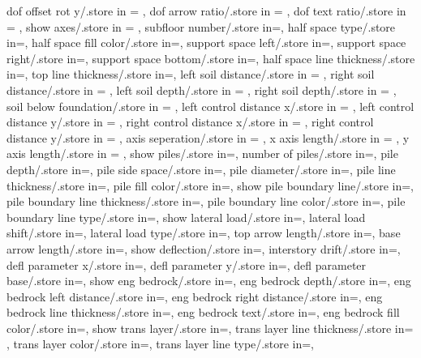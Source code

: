 {  dof offset rot y/.store in = \dofrotoffsety,
  dof arrow ratio/.store in = \dofarrowratio,
  dof text ratio/.store in = \doftextratio,
  show axes/.store in = \showaxes,
  subfloor number/.store in=\subfloors,
  half space type/.store in=\halfspacetype,
  half space fill color/.store in=\halfspacefillcolor,
  support space left/.store in=\hsdistleft,
  support space right/.store in=\hsdistright,
  support space bottom/.store in=\hsdistbottom,
  half space line thickness/.store in=\hsinnerlinethk,
  top line thickness/.store in=\thinlinethk,
  left soil distance/.store in = \leftsoildist,
  right soil distance/.store in = \rightsoildist,
  left soil depth/.store in = \leftsoildepth,
  right soil depth/.store in = \rightsoildepth,
  soil below foundation/.store in = \soilbelowfound,
  left control distance x/.store in = \leftcontrolx,
  left control distance y/.store in = \leftcontroly,
  right control distance x/.store in = \rightcontrolx,
  right control distance y/.store in = \rightcontroly,
  axis seperation/.store in = \axisseperation,
  x axis length/.store in = \axeslenX,
  y axis length/.store in = \axeslenY,
  show piles/.store in=\showpiles,
  number of piles/.store in=\numberofpiles,
  pile depth/.store in=\piledepth,
  pile side space/.store in=\pilesidespace,
  pile diameter/.store in=\pilediameter,
  pile line thickness/.store in=\pilelinethickness,
  pile fill color/.store in=\pilefillcolor,
  show pile boundary line/.store in=\showpbline,
  pile boundary line thickness/.store in=\pblinet,
  pile boundary line color/.store in=\pblinecolor,
  pile boundary line type/.store in=\pblinetype,
  show lateral load/.store in=\showlatload,
  lateral load shift/.store in=\latloadshift,
  lateral load type/.store in=\latloadtype,
  top arrow length/.store in=\toparrlen,
  base arrow length/.store in=\basearrlen,
  show deflection/.store in=\showdefl, 
  interstory drift/.store in=\drift,
  defl parameter x/.store in=,
  defl parameter y/.store in=,
  defl parameter base/.store in=,
  show eng bedrock/.store in=\showengbedrock,
  eng bedrock depth/.store in=\engbedrockdepth,
  eng bedrock left distance/.store in=\engbedrockleftdist,
  eng bedrock right distance/.store in=\engbedrockrightdist,
  eng bedrock line thickness/.store in=\engbedrocklinewidth,
  eng bedrock text/.store in=\engbedrocktext,
  eng bedrock fill color/.store in=\engbedrockfillcolor,
  show trans layer/.store in=\showtranslayer,
  trans layer line thickness/.store in= \translayerlinet,
  trans layer color/.store in=\translayercolor,
  trans layer line type/.store in=\translayerlinetype,
}
